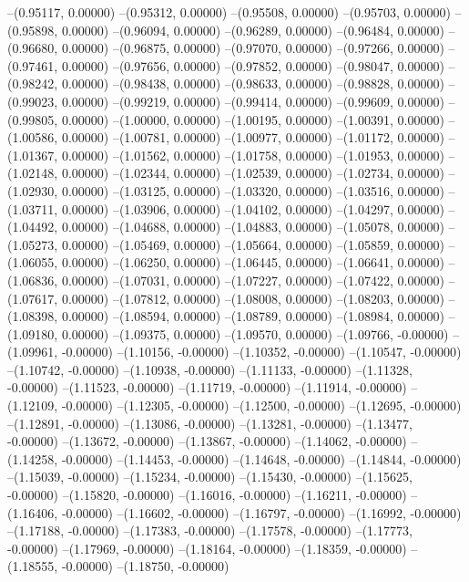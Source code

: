--(0.95117, 0.00000)
--(0.95312, 0.00000)
--(0.95508, 0.00000)
--(0.95703, 0.00000)
--(0.95898, 0.00000)
--(0.96094, 0.00000)
--(0.96289, 0.00000)
--(0.96484, 0.00000)
--(0.96680, 0.00000)
--(0.96875, 0.00000)
--(0.97070, 0.00000)
--(0.97266, 0.00000)
--(0.97461, 0.00000)
--(0.97656, 0.00000)
--(0.97852, 0.00000)
--(0.98047, 0.00000)
--(0.98242, 0.00000)
--(0.98438, 0.00000)
--(0.98633, 0.00000)
--(0.98828, 0.00000)
--(0.99023, 0.00000)
--(0.99219, 0.00000)
--(0.99414, 0.00000)
--(0.99609, 0.00000)
--(0.99805, 0.00000)
--(1.00000, 0.00000)
--(1.00195, 0.00000)
--(1.00391, 0.00000)
--(1.00586, 0.00000)
--(1.00781, 0.00000)
--(1.00977, 0.00000)
--(1.01172, 0.00000)
--(1.01367, 0.00000)
--(1.01562, 0.00000)
--(1.01758, 0.00000)
--(1.01953, 0.00000)
--(1.02148, 0.00000)
--(1.02344, 0.00000)
--(1.02539, 0.00000)
--(1.02734, 0.00000)
--(1.02930, 0.00000)
--(1.03125, 0.00000)
--(1.03320, 0.00000)
--(1.03516, 0.00000)
--(1.03711, 0.00000)
--(1.03906, 0.00000)
--(1.04102, 0.00000)
--(1.04297, 0.00000)
--(1.04492, 0.00000)
--(1.04688, 0.00000)
--(1.04883, 0.00000)
--(1.05078, 0.00000)
--(1.05273, 0.00000)
--(1.05469, 0.00000)
--(1.05664, 0.00000)
--(1.05859, 0.00000)
--(1.06055, 0.00000)
--(1.06250, 0.00000)
--(1.06445, 0.00000)
--(1.06641, 0.00000)
--(1.06836, 0.00000)
--(1.07031, 0.00000)
--(1.07227, 0.00000)
--(1.07422, 0.00000)
--(1.07617, 0.00000)
--(1.07812, 0.00000)
--(1.08008, 0.00000)
--(1.08203, 0.00000)
--(1.08398, 0.00000)
--(1.08594, 0.00000)
--(1.08789, 0.00000)
--(1.08984, 0.00000)
--(1.09180, 0.00000)
--(1.09375, 0.00000)
--(1.09570, 0.00000)
--(1.09766, -0.00000)
--(1.09961, -0.00000)
--(1.10156, -0.00000)
--(1.10352, -0.00000)
--(1.10547, -0.00000)
--(1.10742, -0.00000)
--(1.10938, -0.00000)
--(1.11133, -0.00000)
--(1.11328, -0.00000)
--(1.11523, -0.00000)
--(1.11719, -0.00000)
--(1.11914, -0.00000)
--(1.12109, -0.00000)
--(1.12305, -0.00000)
--(1.12500, -0.00000)
--(1.12695, -0.00000)
--(1.12891, -0.00000)
--(1.13086, -0.00000)
--(1.13281, -0.00000)
--(1.13477, -0.00000)
--(1.13672, -0.00000)
--(1.13867, -0.00000)
--(1.14062, -0.00000)
--(1.14258, -0.00000)
--(1.14453, -0.00000)
--(1.14648, -0.00000)
--(1.14844, -0.00000)
--(1.15039, -0.00000)
--(1.15234, -0.00000)
--(1.15430, -0.00000)
--(1.15625, -0.00000)
--(1.15820, -0.00000)
--(1.16016, -0.00000)
--(1.16211, -0.00000)
--(1.16406, -0.00000)
--(1.16602, -0.00000)
--(1.16797, -0.00000)
--(1.16992, -0.00000)
--(1.17188, -0.00000)
--(1.17383, -0.00000)
--(1.17578, -0.00000)
--(1.17773, -0.00000)
--(1.17969, -0.00000)
--(1.18164, -0.00000)
--(1.18359, -0.00000)
--(1.18555, -0.00000)
--(1.18750, -0.00000)
